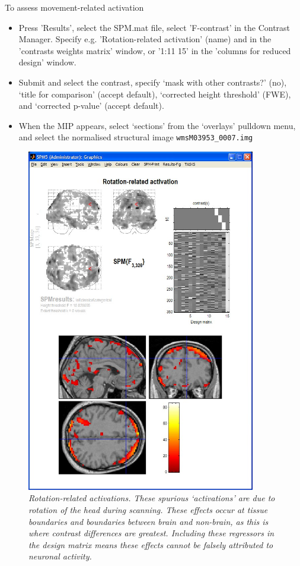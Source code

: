 \documentclass[a4paper,titlepage]{book}
\newcommand{\bi}{\begin{itemize}}
\newcommand{\ei}{\end{itemize}}
\begin{document}
To assess movement-related activation
\bi
\item{Press 'Results', select the SPM.mat file, select 'F-contrast' in the Contrast Manager. Specify e.g. 'Rotation-related activation' (name) and 
in the 'contrasts weights matrix' window, or '1:11 15' in the 'columns for reduced design' window.} 
\item{
Submit and select the contrast, specify `mask with other contrasts?' (no), `title for comparison' (accept default), `corrected height threshold' (FWE), and `corrected p-value' (accept default).}
 \item{When the MIP appears, select `sections' from the `overlays' pulldown
 menu, and select the normalised structural image
 \verb!wmsM03953_0007.img!}
 \ei
\begin{figure}
\begin{center}
\includegraphics[width=100mm]{rotations}
\caption{\em Rotation-related activations. These spurious `activations' are due to rotation of the head during scanning. These effects occur at tissue boundaries and boundaries between brain and non-brain, as this is where contrast differences 
are greatest. Including these regressors in the design matrix means these effects cannot be falsely attributed 
to neuronal activity. \label{rotations} }
\end{center}
\end{figure}
\end{document}
